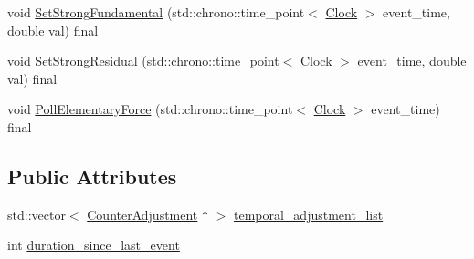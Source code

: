 \begin{DoxyCompactItemize}
void \mbox{\hyperlink{classDimension_a2de864aaa4b1074684395dbe928468c1}{Set\+Strong\+Fundamental}} (std\+::chrono\+::time\+\_\+point$<$ \mbox{\hyperlink{universe_8h_a0ef8d951d1ca5ab3cfaf7ab4c7a6fd80}{Clock}} $>$ event\+\_\+time, double val) final
\item 
void \mbox{\hyperlink{classDimension_a9bd5480b1da689cd58bf61dac7169080}{Set\+Strong\+Residual}} (std\+::chrono\+::time\+\_\+point$<$ \mbox{\hyperlink{universe_8h_a0ef8d951d1ca5ab3cfaf7ab4c7a6fd80}{Clock}} $>$ event\+\_\+time, double val) final
\item 
void \mbox{\hyperlink{classDimension_a5b07f5c8558233c8f3488baf1fe3459a}{Poll\+Elementary\+Force}} (std\+::chrono\+::time\+\_\+point$<$ \mbox{\hyperlink{universe_8h_a0ef8d951d1ca5ab3cfaf7ab4c7a6fd80}{Clock}} $>$ event\+\_\+time) final
\end{DoxyCompactItemize}
\subsection*{Public Attributes}
\begin{DoxyCompactItemize}
\item 
std\+::vector$<$ \mbox{\hyperlink{structDimension_1_1CounterAdjustment}{Counter\+Adjustment}} $\ast$ $>$ \mbox{\hyperlink{classDimension_a370bb42cca1211c7a6c66846ecec4dd9}{temporal\+\_\+adjustment\+\_\+list}}
\item 
int \mbox{\hyperlink{classDimension_a8095020214e474081002dbf7d9ff9d42}{duration\+\_\+since\+\_\+last\+\_\+event}}
\end{DoxyCompactItemize}
